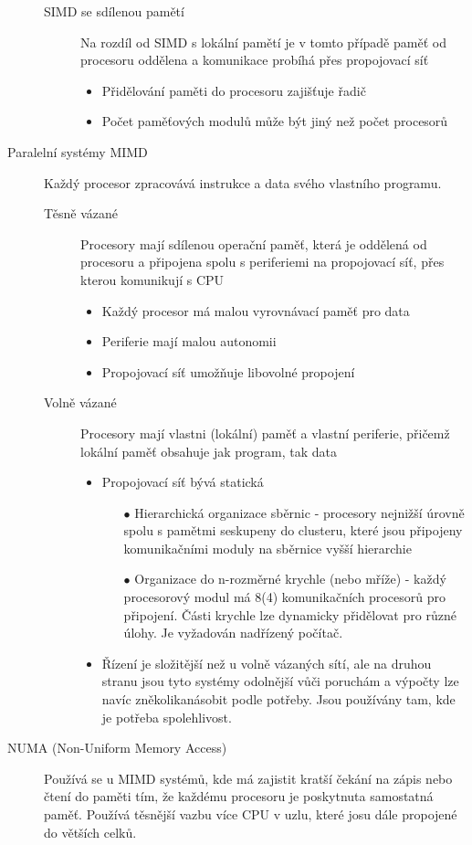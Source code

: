 \documentclass[10pt,a4paper,openright]{article}
\begin{document}
\begin{description}
\begin{description}
\item[SIMD se sdílenou pamětí] Na rozdíl od SIMD s lokální pamětí je v tomto případě paměť od procesoru oddělena a komunikace probíhá přes propojovací síť
	\begin{itemize}
	\item Přidělování paměti do procesoru zajišťuje řadič
	\item Počet paměťových modulů může být jiný než počet procesorů
	\end{itemize}
\end{description}

\item[Paralelní systémy MIMD] Každý procesor zpracovává instrukce a data svého vlastního programu.
\begin{description}
\item[Těsně vázané] Procesory mají sdílenou operační paměť, která je oddělená od procesoru a připojena spolu s periferiemi na propojovací síť, přes kterou komunikují s CPU
	\begin{itemize}
	\item Každý procesor má malou vyrovnávací paměť pro data
	\item Periferie mají malou autonomii
	\item Propojovací síť umožňuje libovolné propojení
	\end{itemize}
\item[Volně vázané]Procesory mají vlastni (lokální) paměť a vlastní periferie, přičemž lokální paměť obsahuje jak program, tak data
	\begin{itemize}
	\item Propojovací síť bývá statická
	\begin{itemize}
		\item[$\bullet$] Hierarchická organizace sběrnic - procesory nejnižší úrovně spolu s pamětmi seskupeny do clusteru, které jsou připojeny komunikačními moduly na sběrnice vyšší hierarchie
		\item[$\bullet$] Organizace do n-rozměrné krychle (nebo mříže) - každý procesorový modul má 8(4) komunikačních procesorů pro připojení. Části krychle lze dynamicky přidělovat pro různé úlohy. Je vyžadován nadřízený počítač.
		\end{itemize}
	\item Řízení je složitější než u volně vázaných sítí, ale na druhou stranu jsou tyto systémy odolnější vůči poruchám a výpočty lze navíc zněkolikanásobit podle potřeby. Jsou používány tam, kde je potřeba spolehlivost.
	\end{itemize}
\end{description}

\item[NUMA (Non-Uniform Memory Access)] Používá se u MIMD systémů, kde má zajistit kratší čekání na zápis nebo čtení do paměti tím, že každému procesoru je poskytnuta samostatná paměť. Používá těsnější vazbu více CPU v uzlu, které josu dále propojené do větších celků.
\end{description}
\end{document}

